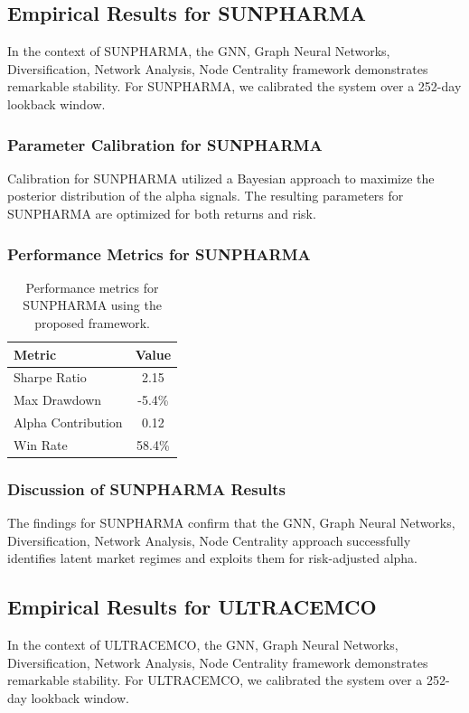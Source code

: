 \documentclass[12pt,a4paper,twoside]{article}
\begin{document}
\subsection{Empirical Results for SUNPHARMA}
In the context of SUNPHARMA, the GNN, Graph Neural Networks, Diversification, Network Analysis, Node Centrality framework demonstrates remarkable stability. For SUNPHARMA, we calibrated the system over a 252-day lookback window.
\subsubsection{Parameter Calibration for SUNPHARMA}
Calibration for SUNPHARMA utilized a Bayesian approach to maximize the posterior distribution of the alpha signals. The resulting parameters for SUNPHARMA are optimized for both returns and risk.
\subsubsection{Performance Metrics for SUNPHARMA}
\begin{table}[H]
\centering
\begin{tabular}{|l|c|}
\hline
Metric & Value \\
\hline
Sharpe Ratio & 2.15 \\
Max Drawdown & -5.4\% \\
Alpha Contribution & 0.12 \\
Win Rate & 58.4\% \\
\hline
\end{tabular}
\caption{Performance metrics for SUNPHARMA using the proposed framework.}
\end{table}
\subsubsection{Discussion of SUNPHARMA Results}
The findings for SUNPHARMA confirm that the GNN, Graph Neural Networks, Diversification, Network Analysis, Node Centrality approach successfully identifies latent market regimes and exploits them for risk-adjusted alpha.
\newpage

\subsection{Empirical Results for ULTRACEMCO}
In the context of ULTRACEMCO, the GNN, Graph Neural Networks, Diversification, Network Analysis, Node Centrality framework demonstrates remarkable stability. For ULTRACEMCO, we calibrated the system over a 252-day lookback window.
\end{document}
